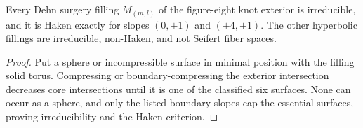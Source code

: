 \begin{corollary}
\label{thurston-ch04-haken-surgery-corollary}
Every Dehn surgery filling \(M_{(m,l)}\) of the figure-eight knot exterior is irreducible, and it is Haken exactly for slopes \((0,\pm1)\) and \((\pm4,\pm1)\). The other hyperbolic fillings are irreducible, non-Haken, and not Seifert fiber spaces.

\end{corollary}

\begin{proof}
\sketch Put a sphere or incompressible surface in minimal position with the filling solid torus. Compressing or boundary-compressing the exterior intersection decreases core intersections until it is one of the classified six surfaces. None can occur as a sphere, and only the listed boundary slopes cap the essential surfaces, proving irreducibility and the Haken criterion.
\end{proof}
